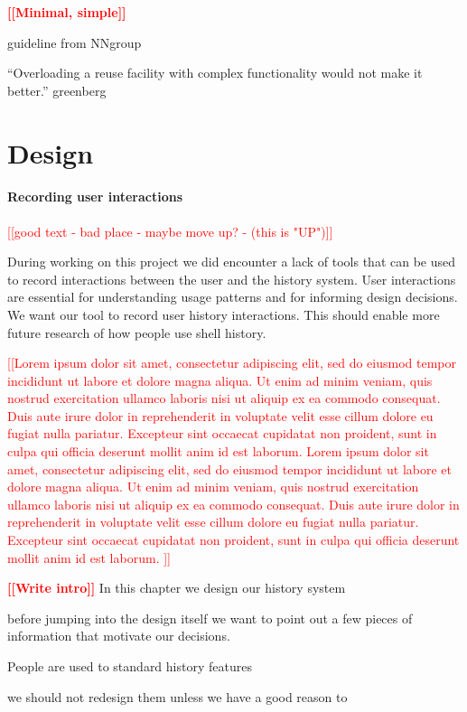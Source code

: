 \documentclass[thesis=M,english]{FITthesis}[2012/10/20]
\newcommand{\todotext}[1]{\textcolor{red}{\textbf{[[#1]]}}}
\newcommand{\redtext}[1]{\textcolor{red}{[[#1]]}}
\begin{document}
\todotext{Minimal, simple}

guideline from NNgroup

“Overloading a reuse facility with complex functionality would not make it better.” greenberg


\chapter{Design}

\subsubsection{Recording user interactions}

\redtext{good text - bad place - maybe move up? - (this is "UP")}

During working on this project we did encounter a lack of tools that can be used to record interactions between the user and the history system.
User interactions are essential for understanding usage patterns and for informing design decisions.
We want our tool to record user history interactions.
This should enable more future research of how people use shell history.

\redtext{Lorem ipsum dolor sit amet, consectetur adipiscing elit, sed do eiusmod tempor incididunt ut labore et dolore magna aliqua. Ut enim ad minim veniam, quis nostrud exercitation ullamco laboris nisi ut aliquip ex ea commodo consequat. Duis aute irure dolor in reprehenderit in voluptate velit esse cillum dolore eu fugiat nulla pariatur. Excepteur sint occaecat cupidatat non proident, sunt in culpa qui officia deserunt mollit anim id est laborum.
Lorem ipsum dolor sit amet, consectetur adipiscing elit, sed do eiusmod tempor incididunt ut labore et dolore magna aliqua. Ut enim ad minim veniam, quis nostrud exercitation ullamco laboris nisi ut aliquip ex ea commodo consequat. Duis aute irure dolor in reprehenderit in voluptate velit esse cillum dolore eu fugiat nulla pariatur. Excepteur sint occaecat cupidatat non proident, sunt in culpa qui officia deserunt mollit anim id est laborum.
}


\todotext{Write intro}
In this chapter we design our history system

before jumping into the design itself we want to point out a few pieces of information that motivate our decisions.


People are used to standard history features

we should not redesign them unless we have a good reason to
\end{document}
